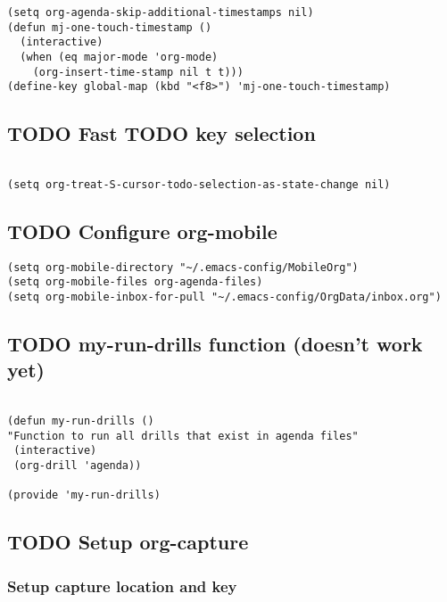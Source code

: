 \documentclass[colorlinks=true,urlcolor=blue,listings-sv]{article}
\begin{document}
\lstset{language=Lisp}
\begin{lstlisting}
(setq org-agenda-skip-additional-timestamps nil)
(defun mj-one-touch-timestamp ()
  (interactive)
  (when (eq major-mode 'org-mode)
    (org-insert-time-stamp nil t t)))
(define-key global-map (kbd "<f8>") 'mj-one-touch-timestamp)
\end{lstlisting}
\subsection{\textbf{TODO} Fast TODO key selection}
\label{sec-2-17}



\lstset{language=Lisp}
\begin{lstlisting}

(setq org-treat-S-cursor-todo-selection-as-state-change nil)
\end{lstlisting}
\subsection{\textbf{TODO} Configure org-mobile}
\label{sec-2-18}



\lstset{language=Lisp}
\begin{lstlisting}
(setq org-mobile-directory "~/.emacs-config/MobileOrg")
(setq org-mobile-files org-agenda-files)
(setq org-mobile-inbox-for-pull "~/.emacs-config/OrgData/inbox.org")
\end{lstlisting}
\subsection{\textbf{TODO} my-run-drills function (doesn't work yet)}
\label{sec-2-19}



\lstset{language=Lisp}
\begin{lstlisting}

(defun my-run-drills ()
"Function to run all drills that exist in agenda files"
 (interactive)
 (org-drill 'agenda))

(provide 'my-run-drills)
\end{lstlisting}
\subsection{\textbf{TODO} Setup org-capture}
\label{sec-2-20}
\label{3f712c43-2db3-4001-93df-ffed1319e19a}
\subsubsection{Setup capture location and key}
\label{sec-2-20-1}
\end{document}
